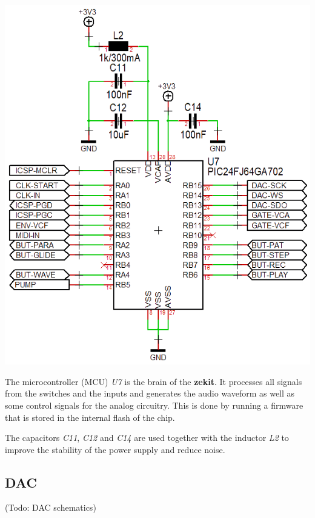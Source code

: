 \documentclass{scrartcl}
\begin{document}
\begin{center}
    \includegraphics[scale=0.55]{assets/schema-mcu.png}
\end{center}

The microcontroller (MCU) \emph{U7} is the brain of the \textbf{zekit}. It processes all signals from the switches and the inputs and generates the audio waveform as well as some control signals for the analog circuitry. This is done by running a firmware that is stored in the internal flash of the chip.

The capacitors \emph{C11}, \emph{C12} and \emph{C14} are used together with the inductor \emph{L2} to improve the stability of the power supply and reduce noise.

\subsection{DAC}

\begin{center}
    (Todo: DAC schematics)
\end{center}
\end{document}
